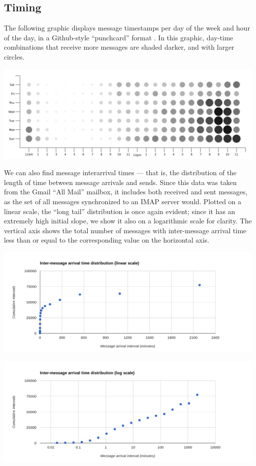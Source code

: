 \documentclass[pageno]{jpaper}
\begin{document}
\subsection{Timing}

The following graphic displays message timestamps per day of the week and hour of the day, in a Github-style ``punchcard'' format \cite{punchcard}. In this graphic, day-time combinations that receive more messages are shaded darker, and with larger circles.

\includegraphics[width=\textwidth]{punchcard}

We can also find message interarrival times \---- that is, the distribution of the length of time between message arrivals and sends. Since this data was taken from the Gmail ``All Mail'' mailbox, it includes both received and sent messages, as the set of all messages synchronized to an IMAP server would. Plotted on a linear scale, the ``long tail'' distribution is once again evident; since it has an extremely high initial slope, we show it also on a logarithmic scale for clarity. The vertical axis shows the total number of messages with inter-message arrival time less than or equal to the corresponding value on the horizontal axis.

\includegraphics[width=\textwidth]{intermessagelinear}

\includegraphics[width=\textwidth]{intermessagelog}
\end{document}
